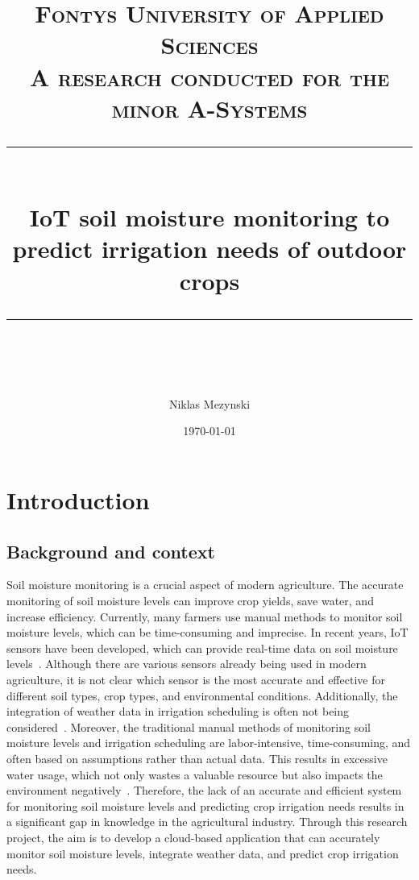 \documentclass[11pt]{scrartcl} %
\title{	
	\normalfont\normalsize
	\textsc{Fontys University of Applied Sciences \\A research conducted for the minor A-Systems}\\ %
	\vspace{25pt} %
	\rule{\linewidth}{0.5pt}\\ %
	\vspace{20pt} %
	{\huge IoT soil moisture monitoring to predict irrigation needs of outdoor crops}\\ %
	\vspace{12pt} %
	\rule{\linewidth}{2pt}\\ %
	\vspace{12pt} %
}
\author{\LARGE Niklas Mezynski} %
\date{\normalsize\today} %
\begin{document}
\maketitle %
\newpage




\setcounter{tocdepth}{2}
\tableofcontents
\newpage

\listoffigures
\newpage

\listoftables
\newpage

\printnoidxglossaries
\cleardoublepage
{}
\setcounter{section}{1}


\section{Introduction}
\subsection{Background and context}
Soil moisture monitoring is a crucial aspect of modern agriculture. The accurate monitoring of soil moisture levels can improve crop yields, save water, and increase efficiency. Currently, many farmers use manual methods to monitor soil moisture levels, which can be time-consuming and imprecise. In recent years, IoT sensors have been developed, which can provide real-time data on soil moisture levels~\parencite{bwambale2022smart}.
\newline Although there are various sensors already being used in modern agriculture, it is not clear which sensor is the most accurate and effective for different soil types, crop types, and environmental conditions. Additionally, the integration of weather data in irrigation scheduling is often not being considered~\parencite{nandurkar2014design}.
\newline Moreover, the traditional manual methods of monitoring soil moisture levels and irrigation scheduling are labor-intensive, time-consuming, and often based on assumptions rather than actual data. This results in excessive water usage, which not only wastes a valuable resource but also impacts the environment negatively~\parencite{bwambale2022smart}.
\newline Therefore, the lack of an accurate and efficient system for monitoring soil moisture levels and predicting crop irrigation needs results in a significant gap in knowledge in the agricultural industry. Through this research project, the aim is to develop a cloud-based application that can accurately monitor soil moisture levels, integrate weather data, and predict crop irrigation needs.
\end{document}
